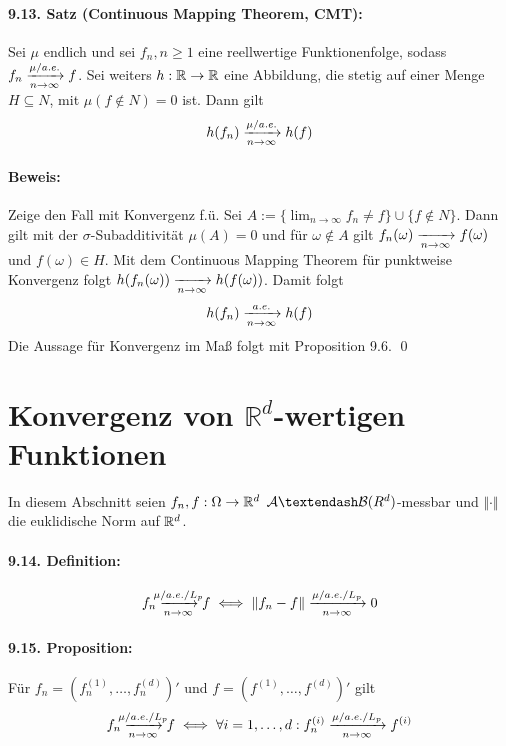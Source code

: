 \documentclass[11pt]{report}
\begin{document}
\paragraph{9.13. Satz (Continuous Mapping Theorem, CMT):}Sei $\mu$ endlich und sei $f_n,n\geq1$ eine reellwertige Funktionenfolge, sodass $f_n\nto{\mu/a.e.}{n\to\infty}f$. Sei weiters $h:\mathbb{R}\to\mathbb{R}$ eine Abbildung, die stetig auf einer Menge $H\subseteq N$, mit $\mu(f\notin N)=0$ ist. Dann gilt
$$h(f_n)\nto{\mu/a.e.}{n\to\infty}h(f)$$

\paragraph{Beweis:}Zeige den Fall mit Konvergenz f.\"u. Sei $A:=\{\lim_{n\to\infty}f_n\neq f\}\cup\{f\notin N\}$. Dann gilt mit der $\sigma$-Subadditivit\"at $\mu(A)=0$ und f\"ur $\omega\notin A$ gilt $f_n(\omega)\nto{}{n\to\infty} f(\omega)$ und $f(\omega)\in H$. Mit dem Continuous Mapping Theorem f\"ur punktweise Konvergenz folgt $h(f_n(\omega))\nto{}{n\to\infty}h(f(\omega))$. Damit folgt 
$$h(f_n)\nto{a.e.}{n\to\infty}h(f)$$
Die Aussage f\"ur Konvergenz im Ma\ss{} folgt mit Proposition 9.6. \qed

\section*{Konvergenz von $\mathbb{R}^d$-wertigen Funktionen}
In diesem Abschnitt seien $f_n,f:\Omega\to\mathbb{R}^d$ $\A\textendash \mathcal{B}(R^d)$-messbar und $\Vert\cdot\Vert$ die euklidische Norm auf $\mathbb{R}^d$.

\paragraph{9.14. Definition:}
$$f_n\nto{\mu/a.e./L_p}{n\to\infty}f\iff\Vert f_n-f\Vert\xrightarrow[n\to\infty]{\makebox[3.5em][c]{$\scriptstyle\mu/a.e./L_p$}}0$$

\paragraph{9.15. Proposition:}F\"ur $f_n=\left(f_n^{(1)},\hdots,f_n^{(d)}\right)'$ und $f=\left(f^{(1)},\hdots,f^{(d)}\right)'$ gilt
$$f_n\nto{\mu/a.e./L_p}{n\to\infty}f\iff\forall i=1,\hdots,d:f_n^{(i)}\xrightarrow[n\to\infty]{\makebox[3.5em][c]{$\scriptstyle\mu/a.e./L_p$}}f^{(i)}$$
\end{document}
